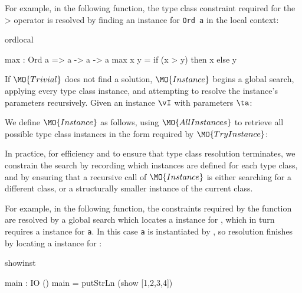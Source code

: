For example, in the following function, the type class constraint required for
the $\texttt{>}$ operator is resolved by finding an instance for \texttt{Ord a}
in the local context:

\begin{SaveVerbatim}{ordlocal}

max : Ord a => a -> a -> a
max x y = if (x > y) then x else y

\end{SaveVerbatim}

If $\MO{Trivial}$ does not find a solution, $\MO{Instance}$ begins a global search,
applying every type class instance, and attempting to resolve the instance's parameters
recursively. Given an instance $\vI$ with parameters $\ta$:


We define $\MO{Instance}$ as follows, using $\MO{AllInstances}$ to retrieve
all possible type class instances in the form required by $\MO{TryInstance}$:


In practice, for efficiency and to ensure that type class resolution terminates,
we constrain the search by recording which instances are defined for each type class,
and by ensuring that a recursive call of $\MO{Instance}$ is either searching for
a different class, or a structurally smaller instance of the current class. 

For example, in the following function, the constraints required by the
 function are resolved by a global search which locates a 
instance for , which in turn requires a  instance for
\texttt{a}.  In this case \texttt{a} is instantiated by , so resolution finishes
by locating a  instance for :

\begin{SaveVerbatim}{showinst}

main : IO ()
main = putStrLn (show [1,2,3,4]) 

\end{SaveVerbatim}

